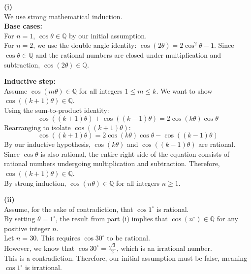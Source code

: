 \begin{solution}[Brief]
\textbf{(i)} \\
We use strong mathematical induction. \\
\textbf{Base cases:} \\
For $n=1$, $\cos \theta \in \mathbb{Q}$ by our initial assumption. \\
For $n=2$, we use the double angle identity: $\cos(2\theta) = 2\cos^2\theta - 1$. Since $\cos\theta \in \mathbb{Q}$ and the rational numbers are closed under multiplication and subtraction, $\cos(2\theta) \in \mathbb{Q}$.

\vspace{10pt}
\textbf{Inductive step:} \\
Assume $\cos(m\theta) \in \mathbb{Q}$ for all integers $1 \le m \le k$. We want to show $\cos((k+1)\theta) \in \mathbb{Q}$. \\
Using the sum-to-product identity:
\[ \cos((k+1)\theta) + \cos((k-1)\theta) = 2\cos(k\theta)\cos\theta \]
Rearranging to isolate $\cos((k+1)\theta)$:
\[ \cos((k+1)\theta) = 2\cos(k\theta)\cos\theta - \cos((k-1)\theta) \]
By our inductive hypothesis, $\cos(k\theta)$ and $\cos((k-1)\theta)$ are rational. Since $\cos \theta$ is also rational, the entire right side of the equation consists of rational numbers undergoing multiplication and subtraction. Therefore, $\cos((k+1)\theta) \in \mathbb{Q}$. \\
By strong induction, $\cos(n\theta) \in \mathbb{Q}$ for all integers $n \ge 1$.

\vspace{15pt}

\textbf{(ii)} \\
Assume, for the sake of contradiction, that $\cos 1^\circ$ is rational. \\
By setting $\theta = 1^\circ$, the result from part (i) implies that $\cos(n^\circ) \in \mathbb{Q}$ for any positive integer $n$. \\
Let $n = 30$. This requires $\cos 30^\circ$ to be rational. \\
However, we know that $\cos 30^\circ = \frac{\sqrt{3}}{2}$, which is an irrational number. \\
This is a contradiction. Therefore, our initial assumption must be false, meaning $\cos 1^\circ$ is irrational.
\end{solution}

